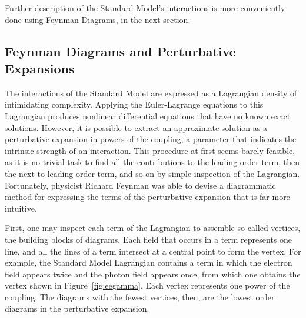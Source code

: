   Further description of the Standard Model's interactions is more conveniently done using Feynman Diagrams, in the next section.

  \subsection{Feynman Diagrams and Perturbative Expansions} \label{sec:feyndiags}

  The interactions of the Standard Model are expressed as a Lagrangian density of intimidating complexity.
  Applying the Euler-Lagrange equations to this Lagrangian produces nonlinear differential equations that have no known exact solutions.
  However, it is possible to extract an approximate solution as a perturbative expansion in powers of the coupling, a parameter that indicates the intrinsic strength of an interaction.
  This procedure at first seems barely feasible, as it is no trivial task to find all the contributions to the leading order term, then the next to leading order term, and so on by simple inspection of the Lagrangian.
  Fortunately, physicist Richard Feynman was able to devise a diagrammatic method for expressing the terms of the perturbative expansion that is far more intuitive.

  First, one may inspect each term of the Lagrangian to assemble so-called vertices, the building blocks of diagrams.
  Each field that occurs in a term represents one line, and all the lines of a term intersect at a central point to form the vertex.
  For example, the Standard Model Lagrangian contains a term in which the electron field appears twice and the photon field appears once, from which one obtains the vertex shown in Figure~\ref{fig:eegamma}.
  Each vertex represents one power of the coupling.
  The diagrams with the fewest vertices, then, are the lowest order diagrams in the perturbative expansion.

